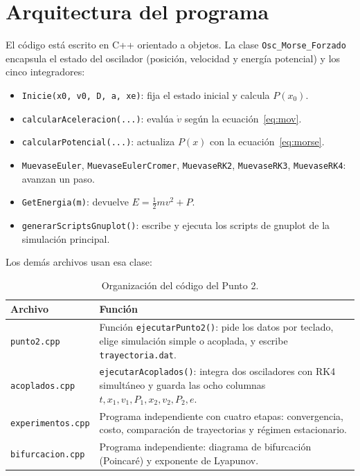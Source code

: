 \documentclass[12pt,a4paper]{article}
\begin{document}
\section{Arquitectura del programa}

El código está escrito en C++ orientado a objetos. La clase \texttt{Osc\_Morse\_Forzado} encapsula el estado del oscilador (posición, velocidad y energía potencial) y los cinco integradores:

\begin{itemize}
    \item \texttt{Inicie(x0, v0, D, a, xe)}: fija el estado inicial y calcula $P(x_0)$.
    \item \texttt{calcularAceleracion(...)}: evalúa $\dot v$ según la ecuación~\eqref{eq:mov}.
    \item \texttt{calcularPotencial(...)}: actualiza $P(x)$ con la ecuación~\eqref{eq:morse}.
    \item \texttt{MuevaseEuler}, \texttt{MuevaseEulerCromer}, \texttt{MuevaseRK2}, \texttt{MuevaseRK3}, \texttt{MuevaseRK4}: avanzan un paso.
    \item \texttt{GetEnergia(m)}: devuelve $E=\tfrac12 mv^{2}+P$.
    \item \texttt{generarScriptsGnuplot()}: escribe y ejecuta los scripts de gnuplot de la simulación principal.
\end{itemize}

Los demás archivos usan esa clase:

\begin{table}[H]
\centering
\small
\begin{tabular}{@{}lp{10.5cm}@{}}
\toprule
Archivo & Función\\
\midrule
\texttt{punto2.cpp} & Función \texttt{ejecutarPunto2()}: pide los datos por teclado, elige simulación simple o acoplada, y escribe \texttt{trayectoria.dat}.\\
\texttt{acoplados.cpp} & \texttt{ejecutarAcoplados()}: integra dos osciladores con RK4 simultáneo y guarda las ocho columnas $t,x_1,v_1,P_1,x_2,v_2,P_2,e$.\\
\texttt{experimentos.cpp} & Programa independiente con cuatro etapas: convergencia, costo, comparación de trayectorias y régimen estacionario.\\
\texttt{bifurcacion.cpp} & Programa independiente: diagrama de bifurcación (Poincaré) y exponente de Lyapunov.\\
\bottomrule
\end{tabular}
\caption{Organización del código del Punto 2.}
\end{table}
\end{document}
